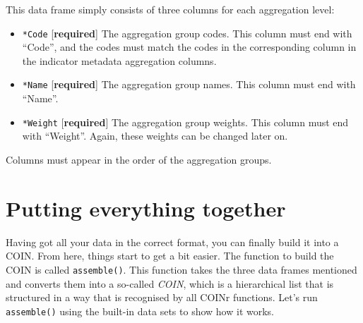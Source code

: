\documentclass[
]{book}
\providecommand{\tightlist}{%
  \setlength{\itemsep}{0pt}\setlength{\parskip}{0pt}}
\begin{document}
This data frame simply consists of three columns for each aggregation level:

\begin{itemize}
\tightlist
\item
  \texttt{*Code} {[}\textbf{required}{]} The aggregation group codes. This column must end with ``Code'', and the codes must match the codes in the corresponding column in the indicator metadata aggregation columns.
\item
  \texttt{*Name} {[}\textbf{required}{]} The aggregation group names. This column must end with ``Name''.
\item
  \texttt{*Weight} {[}\textbf{required}{]} The aggregation group weights. This column must end with ``Weight''. Again, these weights can be changed later on.
\end{itemize}

Columns must appear in the order of the aggregation groups.

\hypertarget{putting-everything-together}{%
\section{Putting everything together}\label{putting-everything-together}}

Having got all your data in the correct format, you can finally build it into a COIN. From here, things start to get a bit easier. The function to build the COIN is called \texttt{assemble()}. This function takes the three data frames mentioned and converts them into a so-called \emph{COIN}, which is a hierarchical list that is structured in a way that is recognised by all COINr functions. Let's run \texttt{assemble()} using the built-in data sets to show how it works.
\end{document}
